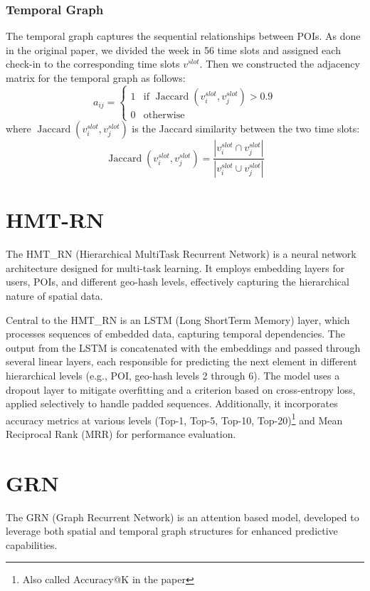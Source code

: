 \documentclass[twocolumn,twoside]{article}
\DeclareMathOperator{\jax}{Jaccard}
\begin{document}
\subsubsection{Temporal Graph}
The temporal graph captures the sequential relationships between
POIs. As done in the original paper,
we divided the week in 56 time slots and assigned each check-in to
the corresponding time slots $v^{slot}$. Then we constructed the adjacency matrix
for the temporal graph as follows:
\begin{equation}
  a_{ij} = \begin{cases}
    1 & \text{if } \jax(v^{slot}_i, v^{slot}_j) > 0.9 \\
    0 & \text{otherwise}
  \end{cases}
\end{equation}
where $\jax(v^{slot}_i, v^{slot}_j)$ is the Jaccard
similarity between the two time slots:
\begin{equation}
  \jax(v^{slot}_i, v^{slot}_j) = \frac{|v^{slot}_i \cap v^{slot}_j|}{|v^{slot}_i \cup v^{slot}_j|}
\end{equation}

\section{HMT-RN}
The HMT\_RN (Hierarchical Multi\-Task Recurrent Network) is a
neural network architecture designed for multi-task learning. It employs
embedding layers for users, POIs, and different geo-hash levels,
effectively capturing the hierarchical nature of spatial data.

Central to the HMT\_RN is an LSTM (Long Short\-Term Memory) layer,
which processes sequences of embedded data, capturing temporal dependencies.
The output from the LSTM is concatenated with the embeddings
and passed through several linear layers, each responsible
for predicting the next element in different hierarchical
levels (e.g., POI, geo-hash levels 2 through 6). The model
uses a dropout layer to mitigate overfitting and a
criterion based on cross-entropy loss, applied selectively
to handle padded sequences. Additionally,
it incorporates accuracy metrics at various
levels (Top-1, Top-5, Top-10, Top-20)\footnote{Also called Accuracy@K in the paper\cite{main_paper}} and
Mean Reciprocal Rank (MRR) for performance
evaluation.
\section{GRN}
The GRN (Graph Recurrent Network) is an attention based model, developed to
leverage both spatial and temporal graph structures for enhanced predictive
capabilities.
\end{document}
